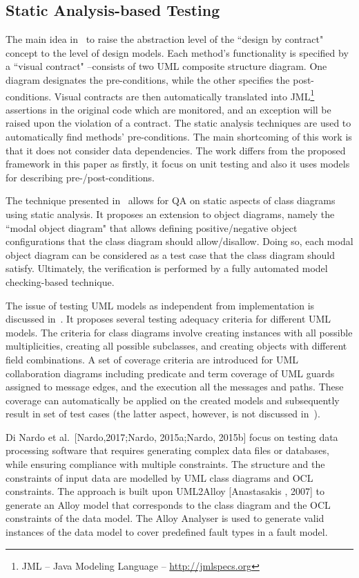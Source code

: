 \subsection{Static Analysis-based Testing}
The main idea in~\cite{Engels2006} to raise the abstraction level of the ``design by contract"~\cite{Meyer1992} concept to the level of design models. Each method's functionality is specified by a ``visual contract" --consists of two UML composite structure diagram. One diagram designates the pre-conditions, while the other specifies the post-conditions. Visual contracts are then automatically translated into JML\footnote{JML – Java Modeling Language – \url{http://jmlspecs.org}} assertions in the original code which are monitored, and an exception will be raised upon the violation of a contract. The static analysis techniques are used to automatically find methods' pre-conditions. The main shortcoming of this work is that it does not consider data dependencies. The work differs from the proposed framework in this paper as firstly,  it focus on unit testing and also it uses models for describing pre-/post-conditions. 

The technique presented in~\cite{Maoz2011} allows for QA on static aspects of class diagrams using static analysis. It proposes an extension to object diagrams, namely the ``modal object diagram" that allows defining positive/negative object configurations that the class diagram should allow/disallow. Doing so, each modal object diagram can be considered as a test case that the class diagram should satisfy. Ultimately, the verification is performed by a fully automated model checking-based technique.

The issue of testing UML models as independent from implementation is discussed in~\cite{Andrews2003}. It proposes several testing adequacy criteria for different UML models. The criteria for class diagrams involve creating instances with all possible multiplicities, creating all possible subclasses, and creating objects with different field combinations. A set of coverage criteria are introduced for UML collaboration diagrams including predicate and term coverage of UML guards assigned to message edges, and the execution all the messages and paths. These coverage can automatically be applied on the created models and subsequently result in set of test cases (the latter aspect, however, is not discussed in~\cite{Andrews2003}).


Di Nardo et al.~[Nardo,2017;Nardo, 2015a;Nardo, 2015b] focus on testing data processing software that requires generating complex data files or databases, while ensuring compliance with multiple constraints. The structure and the constraints of input data are modelled by UML class diagrams and OCL constraints. The approach is built upon UML2Alloy [Anastasakis , 2007] to generate an Alloy model that corresponds to the class diagram and the OCL constraints of the data model. The Alloy Analyser is used to generate valid instances of the data model to cover predefined fault types in a fault model.


